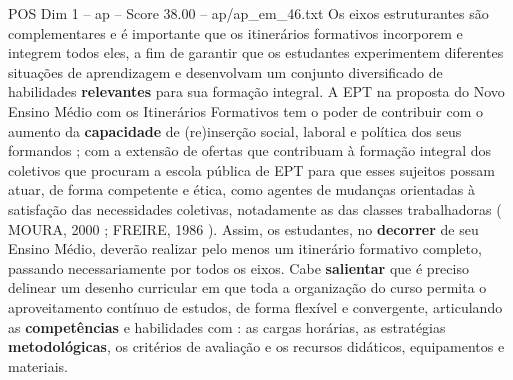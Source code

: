 \begin{textsample}{POS Dim 1 – ap – Score 38.00 – ap/ap\_em\_46.txt}
Os eixos estruturantes são complementares e é importante que os itinerários formativos incorporem e integrem todos eles, a fim de garantir que os estudantes experimentem diferentes situações de aprendizagem e desenvolvam um conjunto diversificado de habilidades \textbf{relevantes} para sua formação integral.
A EPT na proposta do Novo Ensino Médio com os Itinerários Formativos tem o poder de contribuir com o aumento da \textbf{capacidade} de (re)inserção social, laboral e política dos seus formandos ; com a extensão de ofertas que contribuam à formação integral dos coletivos que procuram a escola pública de EPT para que esses sujeitos possam atuar, de forma competente e ética, como agentes de mudanças orientadas à satisfação das necessidades coletivas, notadamente as das classes trabalhadoras ( MOURA, 2000 ; FREIRE, 1986 ).
Assim, os estudantes, no \textbf{decorrer} de seu Ensino Médio, deverão realizar pelo menos um itinerário formativo completo, passando necessariamente por todos os eixos.
Cabe \textbf{salientar} que é preciso delinear um desenho curricular em que toda a organização do curso permita o aproveitamento contínuo de estudos, de forma flexível e convergente, articulando as \textbf{competências} e habilidades com : as cargas horárias, as estratégias \textbf{metodológicas}, os critérios de avaliação e os recursos didáticos, equipamentos e materiais.

\end{textsample}
